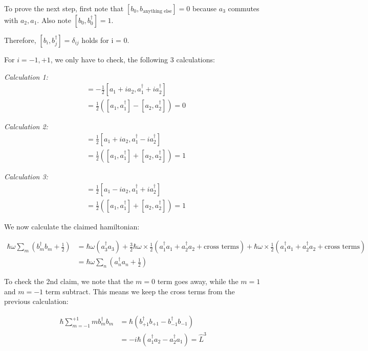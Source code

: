 \documentclass[11pt]{article}
\theoremstyle{definition}
\begin{document}
To prove the next step, first note that $[b_0, b_{\text{anything else}}] = 0$ because $a_3$ commutes with $a_2, a_1$.  
Also note $[b_0, b_0^\dagger] = 1$.

Therefore, $[b_i, b_j^\dagger] = \delta_{ij}$ holds for i = 0.

For $i=-1, +1$, we only have to check, the following 3 calculations:

\emph{Calculation 1:}
\begin{align}
[b_{-1}, b_{+1}^\dagger] & = -\frac12 [a_1 +  i a_2, a_1^\dagger + i a_2^\dagger] \\
& = \frac12 \left( [a_1, a_1^\dagger] - [a_2, a_2^\dagger] \right) = 0
\end{align}

\emph{Calculation 2:}
\begin{align}
[b_{-1}, b_{-1}^\dagger] & = \frac12 [a_1 +  i a_2, a_1^\dagger - i a_2^\dagger] \\
& = \frac12 \left( [a_1, a_1^\dagger] + [a_2, a_2^\dagger] \right) = 1
\end{align}

\emph{Calculation 3:}
\begin{align}
[b_{+1}, b_{+1}^\dagger] & = \frac12 [a_1 -  i a_2, a_1^\dagger + i a_2^\dagger] \\
& = \frac12 \left( [a_1, a_1^\dagger] + [a_2, a_2^\dagger] \right) = 1
\end{align}

We now calculate the claimed hamiltonian:

\begin{align}
\hbar \omega \sum_m \left(b_m^\dagger b_m + \frac 12 \right) & = \hbar \omega (a_3^\dagger a_3 ) + \frac32 
\hbar \omega \times \frac12 (a_1^\dagger a_1 + a_2^\dagger a_2 + \text{cross terms}) + 
\hbar \omega \times \frac12 (a_1^\dagger a_1 + a_2^\dagger a_2 + \text{cross terms}) \\
& = \hbar \omega \sum_n (a_n^\dagger a_n + \frac12)
\end{align}

To check the 2nd claim, we note that the $m=0$ term goes away, while the $m=1$ and $m=-1$ term subtract.  This means we keep the cross terms from the previous calculation:

\begin{align}
\hbar \sum_{m=-1}^{+1} m b_m^\dagger b_m &= \hbar ( b_{+1}^\dagger b_{+1} - b_{-1}^\dagger b_{-1}) \\
& = -i \hbar \left(a_1^\dagger a_2 - a_2^\dagger a_1 \right) = \hat{L}^3
\end{align}
\end{document}

